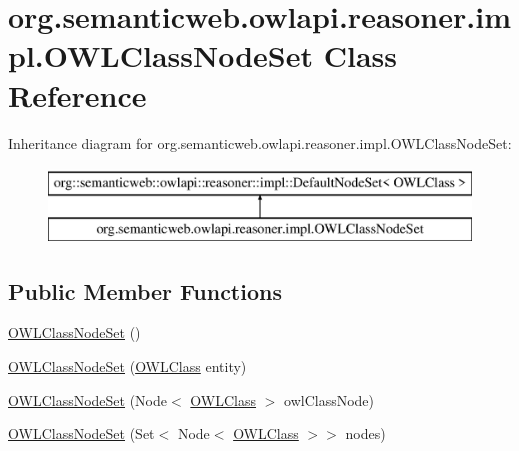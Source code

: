 \hypertarget{classorg_1_1semanticweb_1_1owlapi_1_1reasoner_1_1impl_1_1_o_w_l_class_node_set}{\section{org.\-semanticweb.\-owlapi.\-reasoner.\-impl.\-O\-W\-L\-Class\-Node\-Set Class Reference}
\label{classorg_1_1semanticweb_1_1owlapi_1_1reasoner_1_1impl_1_1_o_w_l_class_node_set}
}
Inheritance diagram for org.\-semanticweb.\-owlapi.\-reasoner.\-impl.\-O\-W\-L\-Class\-Node\-Set\-:\begin{figure}[H]
\begin{center}
\leavevmode
\includegraphics[height=2.000000cm]{classorg_1_1semanticweb_1_1owlapi_1_1reasoner_1_1impl_1_1_o_w_l_class_node_set}
\end{center}
\end{figure}
\subsection*{Public Member Functions}
\begin{DoxyCompactItemize}
\item 
\hyperlink{classorg_1_1semanticweb_1_1owlapi_1_1reasoner_1_1impl_1_1_o_w_l_class_node_set_a1e37f37cf820807ba9f159d20c82e915}{O\-W\-L\-Class\-Node\-Set} ()
\item 
\hyperlink{classorg_1_1semanticweb_1_1owlapi_1_1reasoner_1_1impl_1_1_o_w_l_class_node_set_af38a469f3e5a6787fbf81130924bd795}{O\-W\-L\-Class\-Node\-Set} (\hyperlink{interfaceorg_1_1semanticweb_1_1owlapi_1_1model_1_1_o_w_l_class}{O\-W\-L\-Class} entity)
\item 
\hyperlink{classorg_1_1semanticweb_1_1owlapi_1_1reasoner_1_1impl_1_1_o_w_l_class_node_set_aaefe07e74f5b22a66e2717a4e59e4918}{O\-W\-L\-Class\-Node\-Set} (Node$<$ \hyperlink{interfaceorg_1_1semanticweb_1_1owlapi_1_1model_1_1_o_w_l_class}{O\-W\-L\-Class} $>$ owl\-Class\-Node)
\item 
\hyperlink{classorg_1_1semanticweb_1_1owlapi_1_1reasoner_1_1impl_1_1_o_w_l_class_node_set_a763b48204c41d0904917989a8388565d}{O\-W\-L\-Class\-Node\-Set} (Set$<$ Node$<$ \hyperlink{interfaceorg_1_1semanticweb_1_1owlapi_1_1model_1_1_o_w_l_class}{O\-W\-L\-Class} $>$$>$ nodes)
\end{DoxyCompactItemize}

